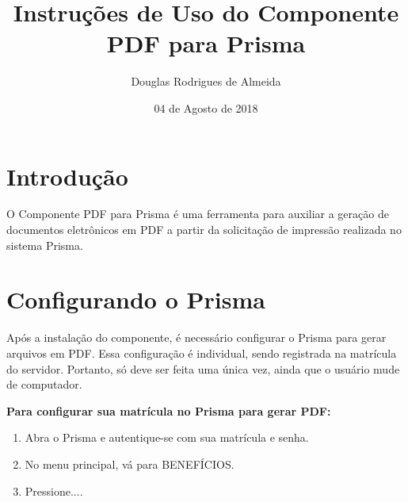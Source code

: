 \documentclass[12pt,a4paper]{article}
\title{Instruções de Uso do Componente PDF para Prisma}
\author{Douglas Rodrigues de Almeida}
\date{04 de Agosto de 2018}
\begin{document}
\maketitle

\section{Introdução}
O Componente PDF para Prisma é uma ferramenta para auxiliar a geração de documentos eletrônicos em PDF a partir da solicitação de impressão realizada no sistema Prisma.

\section{Configurando o Prisma}
Após a instalação do componente, é necessário configurar o Prisma para gerar arquivos em PDF. Essa configuração é individual, sendo registrada na matrícula do servidor. Portanto, só deve ser feita uma única vez, ainda que o usuário mude de computador.

\textbf{Para configurar sua matrícula no Prisma para gerar PDF:}

\begin{enumerate}
  \item Abra o Prisma e autentique-se com sua matrícula e senha.
  \item No menu principal, vá para BENEFÍCIOS.
  \item Pressione....
\end{enumerate}
\end{document}
